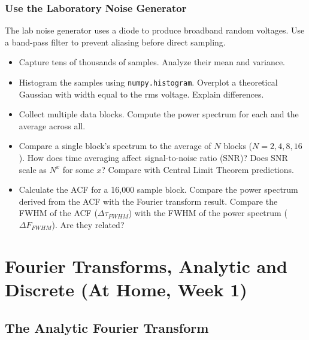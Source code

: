 \documentclass[11pt,preprint]{aastex}
\begin{document}
\subsubsection{Use the Laboratory Noise Generator}

\noindent
The lab noise generator uses a diode to produce broadband random voltages.
Use a band-pass filter to prevent aliasing before direct sampling.

\begin{itemize}
    \item Capture tens of thousands of samples.
    Analyze their mean and variance.

    \item Histogram the samples using {\tt numpy.histogram}.
    Overplot a theoretical Gaussian with width equal to the rms voltage.
    Explain differences.

    \item Collect multiple data blocks.
    Compute the power spectrum for each and the average across all.

    \item Compare a single block's spectrum to the average of $N$ blocks
    ($N=2, 4, 8, 16$).
    How does time averaging affect signal-to-noise ratio (SNR)?
    Does SNR scale as $N^x$ for some $x$?
    Compare with Central Limit Theorem predictions.

    \item Calculate the ACF for a 16,000 sample block.
    Compare the power spectrum derived from the ACF with the Fourier transform result.
    Compare the FWHM of the ACF ($\Delta \tau_{FWHM}$) with the FWHM of the
    power spectrum ($\Delta F_{FWHM}$).
    Are they related?
\end{itemize}


\section{Fourier Transforms, Analytic and Discrete (At Home, Week 1)}
\label{pwrspectrum}

\subsection{The Analytic Fourier Transform}
\end{document}
